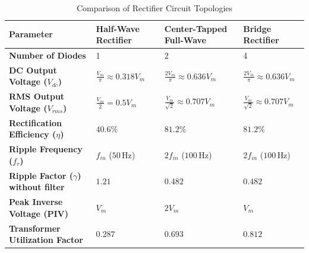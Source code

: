 \begin{table}[htbp]
\centering
\small
\caption{Comparison of Rectifier Circuit Topologies}
\label{tab:rectifiers}
\begin{tabularx}{\textwidth}{lXXX}
\toprule
\textbf{Parameter} & \textbf{Half-Wave Rectifier} & \textbf{Center-Tapped Full-Wave} & \textbf{Bridge Rectifier} \\
\midrule
\textbf{Number of Diodes} & 1 & 2 & 4 \\
\textbf{DC Output Voltage ($V_{dc}$)} & $\frac{V_m}{\pi} \approx 0.318 V_m$ & $\frac{2V_m}{\pi} \approx 0.636 V_m$ & $\frac{2V_m}{\pi} \approx 0.636 V_m$ \\
\textbf{RMS Output Voltage ($V_{rms}$)} & $\frac{V_m}{2} = 0.5 V_m$ & $\frac{V_m}{\sqrt{2}} \approx 0.707 V_m$ & $\frac{V_m}{\sqrt{2}} \approx 0.707 V_m$ \\
\textbf{Rectification Efficiency ($\eta$)} & $40.6\%$ & $81.2\%$ & $81.2\%$ \\
\textbf{Ripple Frequency ($f_r$)} & $f_{in}$ ($50\,\text{Hz}$) & $2 f_{in}$ ($100\,\text{Hz}$) & $2 f_{in}$ ($100\,\text{Hz}$) \\
\textbf{Ripple Factor ($\gamma$) without filter} & $1.21$ & $0.482$ & $0.482$ \\
\textbf{Peak Inverse Voltage (PIV)} & $V_m$ & $2 V_m$ & $V_m$ \\
\textbf{Transformer Utilization Factor} & $0.287$ & $0.693$ & $0.812$ \\
\bottomrule
\end{tabularx}
\end{table}

